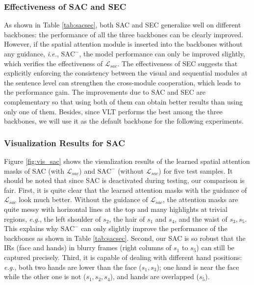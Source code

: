 \documentclass[acmsmall,screen]{acmart}
\def\eg{\emph{e.g.}} \def\Eg{\emph{E.g.}}
\def\ie{\emph{i.e.}} \def\Ie{\emph{I.e.}}
\begin{document}
 \subsubsection{Effectiveness of SAC and SEC}
As shown in Table \ref{tab:sacsec}, both SAC and SEC generalize well on different backbones: the performance of all the three backbones can be clearly improved.
However, if the spatial attention module is inserted into the backbones without any guidance, \ie, $\text{SAC}^-$, the model performance can only be improved slightly, which verifies the effectiveness of $\mathcal{L}_{sac}$.
The effectiveness of SEC suggests that explicitly enforcing the consistency between the visual and sequential modules at the sentence level can strengthen the cross-module cooperation, which leads to the performance gain.
The improvements due to SAC and SEC are complementary so that using both of them can obtain better results than using only one of them.
Besides, since VLT performs the best among the three backbones, we will use it as the default backbone for the following experiments.

\subsubsection{Visualization Results for SAC}
Figure \ref{fig:vis_sac} shows the visualization results of the learned spatial attention masks of SAC (with $\mathcal{L}_{sac}$) and $\text{SAC}^-$ (without $\mathcal{L}_{sac}$) for five test samples.
It should be noted that since SAC is deactivated during testing, our comparison is fair.
First, it is quite clear that the learned attention masks with the guidance of $\mathcal{L}_{sac}$ look much better.
Without the guidance of $\mathcal{L}_{sac}$, the attention masks are quite messy with horizontal lines at the top and many highlights at trivial regions, \eg, the left shoulder of $s_2$, the hair of $s_1$ and $s_4$, and the waist of $s_3, s_5$.
This explains why $\text{SAC}^-$ can only slightly improve the performance of the backbones as shown in Table \ref{tab:sacsec}.
Second, our SAC is so robust that the IRs (face and hands) in blurry frames (right columns of $s_1$ to $s_5$) can still be captured precisely.
Third, it is capable of dealing with different hand positions: \eg, both two hands are lower than the face ($s_1, s_3$); one hand is near the face while the other one is not ($s_1, s_2, s_4$), and hands are overlapped ($s_5$).
\end{document}
